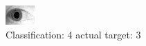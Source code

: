 \begin{figure}[h!]
\begin{center}
\includegraphics[width=0.60\columnwidth]{figures/ID1806_class_4_target_3.png}
\end{center}
\caption{ Classification: 4 actual target: 3}
\label{fig:ID1806_class_4_target_3}
\end{figure}

